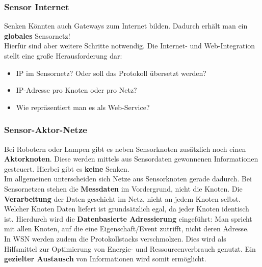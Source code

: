 \documentclass[a4paper]{article}
\begin{document}
\subsubsection{Sensor Internet}
Senken Könnten auch Gateways zum Internet bilden. Dadurch erhält man ein \textbf{globales} Sensornetz! \\
Hierfür sind aber weitere Schritte notwendig. Die Internet- und Web-Integration stellt eine große Herausforderung dar:
\begin{itemize}
	\item IP im Sensornetz? Oder soll das Protokoll übersetzt werden?
	\item IP-Adresse pro Knoten oder pro Netz?
	\item Wie repräsentiert man es als Web-Service?
\end{itemize}
\subsubsection{Sensor-Aktor-Netze} 
Bei Robotern oder Lampen gibt es neben Sensorknoten zusätzlich noch einen \textbf{Aktorknoten}. Diese werden mittels aus Sensordaten gewonnenen Informationen gesteuert. Hierbei gibt es \textbf{keine} Senken.\\

Im allgemeinen unterscheiden sich Netze aus Sensorknoten gerade dadurch. Bei Sensornetzen stehen die \textbf{Messdaten} im Vordergrund, nicht die Knoten. Die \textbf{Verarbeitung} der Daten geschieht im Netz, nicht an jedem Knoten selbst. Welcher Knoten Daten liefert ist grundsätzlich egal, da jeder Knoten identisch ist. Hierdurch wird die \textbf{Datenbasierte Adressierung} eingeführt: Man spricht mit allen Knoten, auf die eine Eigenschaft/Event zutrifft, nicht deren Adresse.\\

In WSN werden zudem die Protokollstacks verschmolzen. Dies wird als Hilfsmittel zur Optimierung von Energie- und Ressourcenverbrauch genutzt. Ein \textbf{gezielter Austausch} von Informationen wird somit ermöglicht.


	
	
	
	
	
	
	
	
	
	
	
	
	
	
	
	
	
	
	
	
	
	
	
	
	
	
\end{document}
